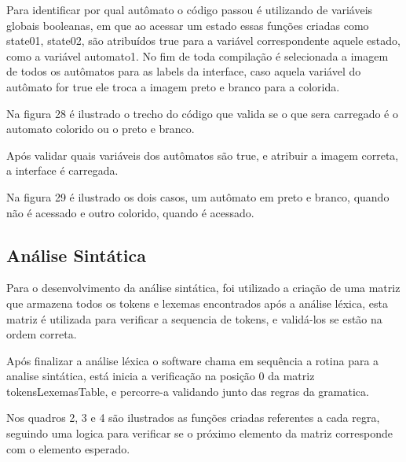 \documentclass[12pt,oneside,a4paper,chapter=TITLE,section=TITLE,sumario=tradicional]{abntex2}
\begin{document}
Para identificar por qual autômato o código passou é utilizando de variáveis globais booleanas, em que ao acessar um estado essas funções criadas como state01, state02, são atribuídos true para a variável correspondente aquele estado, como a variável automato1. No fim de toda compilação é selecionada a imagem de todos os autômatos para as labels da interface, caso aquela variável do autômato for true ele troca a imagem preto e branco para a colorida.  

Na figura 28 é ilustrado o trecho do código que valida se o que sera carregado é o automato colorido ou o preto e branco. 

\begin{figure}[htb]
\end{figure} 

Após validar quais variáveis dos autômatos são true, e atribuir a imagem correta, a interface é carregada. 

Na figura 29 é ilustrado os dois casos, um autômato em preto e branco, quando não é acessado e outro colorido, quando é acessado. 

\begin{figure}[htb]
\end{figure} 

\subsection{Análise Sintática}
\label{subsec:analisesintatica}

Para o desenvolvimento da análise sintática, foi utilizado a criação de uma matriz que armazena todos os tokens e lexemas encontrados após a análise léxica, esta matriz é utilizada para verificar a sequencia de tokens, e validá-los se estão na ordem correta.  

Após finalizar a análise léxica o software chama em sequência a rotina para a analise sintática, está inicia a verificação na posição 0 da matriz tokensLexemasTable, e percorre-a validando junto das regras da gramatica.  

Nos quadros 2, 3 e 4 são ilustrados as funções criadas referentes a cada regra, seguindo uma logica para verificar se o próximo elemento da matriz corresponde com o elemento esperado. 
\end{document}

